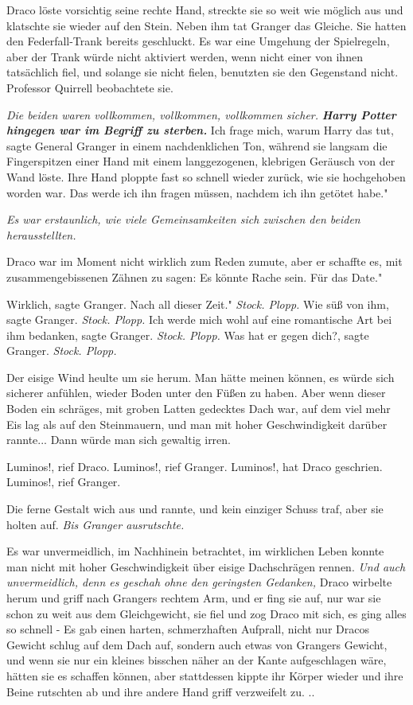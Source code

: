 Draco löste vorsichtig seine rechte Hand, streckte sie so weit wie möglich aus
und klatschte sie wieder auf den Stein. Neben ihm tat Granger das Gleiche. Sie
hatten den Federfall-Trank bereits geschluckt. Es war eine Umgehung der
Spielregeln, aber der Trank würde nicht aktiviert werden, wenn nicht einer von
ihnen tatsächlich fiel, und solange sie nicht fielen, benutzten sie den
Gegenstand nicht. Professor Quirrell beobachtete sie.

\emph{Die beiden waren vollkommen, vollkommen, vollkommen sicher.}
\textbf{\emph{Harry Potter hingegen war im Begriff zu sterben.}}\textbf{} \glqq
Ich frage mich, warum Harry das tut\grqq{}, sagte General Granger in einem
nachdenklichen Ton, während sie langsam die Fingerspitzen einer Hand mit einem
langgezogenen, klebrigen Geräusch von der Wand löste. Ihre Hand ploppte fast so
schnell wieder zurück, wie sie hochgehoben worden war. \glqq{}Das werde ich ihn
fragen müssen, nachdem ich ihn getötet habe."

\emph{Es war erstaunlich, wie viele Gemeinsamkeiten sich zwischen den beiden
herausstellten.}

Draco war im Moment nicht wirklich zum Reden zumute, aber er schaffte es, mit
zusammengebissenen Zähnen zu sagen: \glqq{}Es könnte Rache sein. Für das Date."

\glqq{}Wirklich\grqq{}, sagte Granger. \glqq{}Nach all dieser Zeit."
\emph{Stock. Plopp.}
\glqq{}Wie süß von ihm\grqq{}, sagte Granger.
\emph{Stock. Plopp.}
\glqq{}Ich werde mich wohl auf eine romantische Art bei ihm bedanken\grqq{},
sagte Granger.
\emph{Stock. Plopp.}
\glqq{}Was hat er gegen dich?\grqq{}, sagte Granger.
\emph{Stock. Plopp.}

Der eisige Wind heulte um sie herum. Man hätte meinen können, es würde sich
sicherer anfühlen, wieder Boden unter den Füßen zu haben. Aber wenn dieser Boden
ein schräges, mit groben Latten gedecktes Dach war, auf dem viel mehr Eis lag
als auf den Steinmauern, und man mit hoher Geschwindigkeit darüber rannte...
Dann würde man sich gewaltig irren.

\glqq{}Luminos!\grqq{}, rief Draco. \glqq{}Luminos!\grqq{}, rief Granger. \glqq
Luminos!\grqq{}, hat Draco geschrien. \glqq{}Luminos!\grqq{}, rief Granger.

Die ferne Gestalt wich aus und rannte, und kein einziger Schuss traf, aber sie
holten auf. \emph{ Bis Granger ausrutschte.}

Es war unvermeidlich, im Nachhinein betrachtet, im wirklichen Leben konnte man
nicht mit hoher Geschwindigkeit über eisige Dachschrägen rennen.
\emph{Und auch unvermeidlich, denn es geschah ohne den geringsten Gedanken,}
Draco wirbelte herum und griff nach Grangers rechtem Arm, und er fing sie auf,
nur war sie schon zu weit aus dem Gleichgewicht, sie fiel und zog Draco mit
sich, es ging alles so schnell - Es gab einen harten, schmerzhaften Aufprall,
nicht nur Dracos Gewicht schlug auf dem Dach auf, sondern auch etwas von
Grangers Gewicht, und wenn sie nur ein kleines bisschen näher an der Kante
aufgeschlagen wäre, hätten sie es schaffen können, aber stattdessen kippte ihr
Körper wieder und ihre Beine rutschten ab und ihre andere Hand griff verzweifelt
zu. ..

